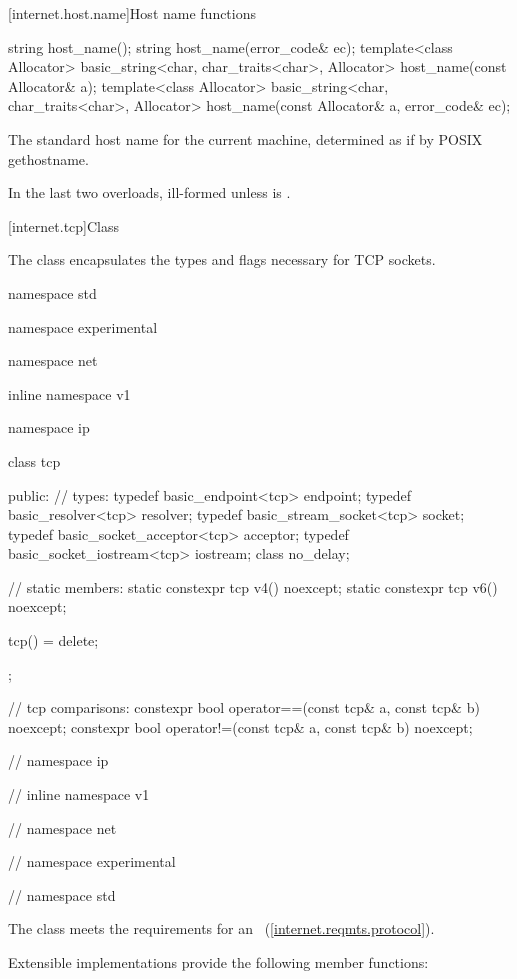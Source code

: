 [internet.host.name]{Host name functions}

\begin{itemdecl}
string host_name();
string host_name(error_code& ec);
template<class Allocator>
  basic_string<char, char_traits<char>, Allocator>
    host_name(const Allocator& a);
template<class Allocator>
  basic_string<char, char_traits<char>, Allocator>
    host_name(const Allocator& a, error_code& ec);
\end{itemdecl}

\begin{itemdescr}
\pnum
\returns The standard host name for the current machine, determined as if by POSIX gethostname.

\pnum
\remarks In the last two overloads, ill-formed unless  is .
\end{itemdescr}



[internet.tcp]{Class }

\pnum
The class  encapsulates the types and flags necessary for TCP sockets.

\begin{codeblock}
namespace std {
namespace experimental {
namespace net {
inline namespace v1 {
namespace ip {

  class tcp
  {
  public:
    // types:
    typedef basic_endpoint<tcp> endpoint;
    typedef basic_resolver<tcp> resolver;
    typedef basic_stream_socket<tcp> socket;
    typedef basic_socket_acceptor<tcp> acceptor;
    typedef basic_socket_iostream<tcp> iostream;
    class no_delay;

    // static members:
    static constexpr tcp v4() noexcept;
    static constexpr tcp v6() noexcept;

    tcp() = delete;
  };

  // tcp comparisons:
  constexpr bool operator==(const tcp& a, const tcp& b) noexcept;
  constexpr bool operator!=(const tcp& a, const tcp& b) noexcept;

} // namespace ip
} // inline namespace v1
} // namespace net
} // namespace experimental
} // namespace std
\end{codeblock}

\pnum
The  class meets the requirements for an ~(\ref{internet.reqmts.protocol}).

\pnum
 Extensible implementations provide the following member functions:

